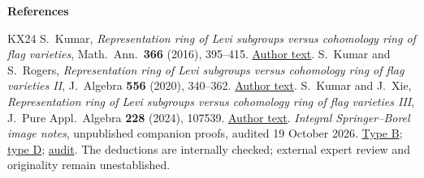 \documentclass[11pt,letterpaper]{article}
\begin{document}
\vspace{2pt}
\noindent\textbf{References}
{\small
\renewcommand{\section}[2]{}
\begin{thebibliography}{KX24}
\setlength{\itemsep}{2pt}
\setlength{\parskip}{0pt}
S.~Kumar, \emph{Representation ring of Levi subgroups versus cohomology
ring of flag varieties}, Math.\ Ann.\ \textbf{366} (2016), 395--415.
\href{https://kumar.math.unc.edu/papers/kumar76.pdf}{Author text}.
S.~Kumar and S.~Rogers, \emph{Representation ring of Levi subgroups versus
cohomology ring of flag varieties II}, J.~Algebra \textbf{556} (2020),
340--362. \href{https://kumar.math.unc.edu/papers/kumar81.pdf}{Author text}.
S.~Kumar and J.~Xie, \emph{Representation ring of Levi subgroups versus
cohomology ring of flag varieties III}, J.~Pure Appl.\ Algebra
\textbf{228} (2024), 107539.
\href{https://kumar.math.unc.edu/papers/kumar86.pdf}{Author text}.
\emph{Integral Springer--Borel image notes}, unpublished companion proofs,
audited 19 October 2026.
\href{https://github.com/sean-rogers-t/Sage-programs/blob/b16f582e29947a402672d160b363d8c9a2f60c11/borel/TYPE_B_GENERAL_SMITH.md}{Type B};
\href{https://github.com/sean-rogers-t/Sage-programs/blob/b16f582e29947a402672d160b363d8c9a2f60c11/borel/TYPE_D_EVEN_GLUING_THEOREM.md}{type D};
\href{https://github.com/sean-rogers-t/Sage-programs/blob/b16f582e29947a402672d160b363d8c9a2f60c11/borel/TYPE_D_EVEN_GLUING_AUDIT.md}{audit}.
The deductions are internally checked; external expert review and
originality remain unestablished.
\end{thebibliography}
}
\end{document}
